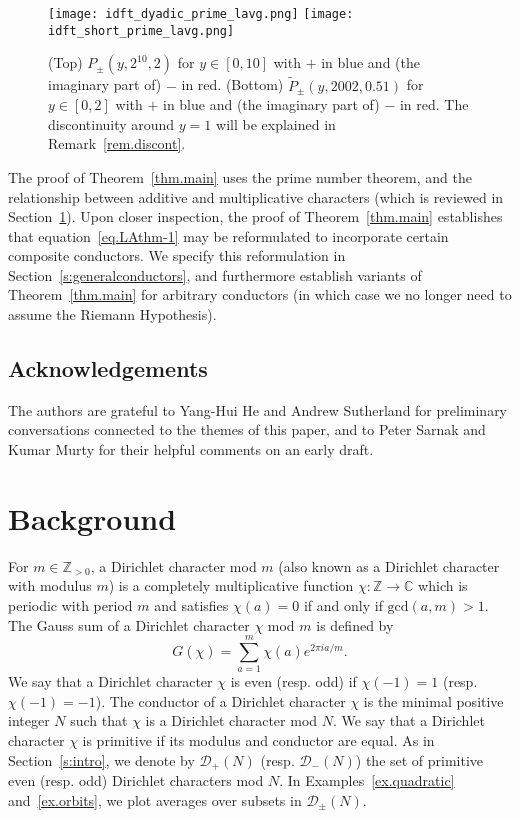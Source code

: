 \documentclass{amsart}
\theoremstyle{definition}
\numberwithin{equation}{section}
\begin{document}
\begin{figure}[h]
\centering
\texttt{[image: idft\_dyadic\_prime\_lavg.png]}
\texttt{[image: idft\_short\_prime\_lavg.png]}
\caption{\sf (Top) $P_\pm(y, 2^{10}, 2)$ for $y \in [0,10]$ with $+$ in blue and (the imaginary part of) $-$ in red. (Bottom) $\widetilde{P}_\pm(y, 2002, 0.51)$ for $y \in [0,2]$ with $+$ in blue and (the imaginary part of) $-$ in red. The discontinuity around $y=1$ will be explained in Remark~\ref{rem.discont}. }
    \label{fig:prime_lavg}
\end{figure}
The proof of Theorem~\ref{thm.main} uses the prime number theorem, and the relationship between additive and multiplicative characters (which is reviewed in Section~\ref{s:background}).
Upon closer inspection, the proof of Theorem~\ref{thm.main} establishes that equation~\eqref{eq.LAthm-1} may be reformulated to incorporate certain composite conductors.
We specify this reformulation in Section~\ref{s:generalconductors}, and furthermore establish variants of Theorem~\ref{thm.main} for arbitrary conductors (in which case we no longer need to assume the Riemann Hypothesis).

\subsection*{Acknowledgements}
The authors are grateful to Yang-Hui He and Andrew Sutherland for preliminary conversations connected to the themes of this paper, and to Peter Sarnak and Kumar Murty for their helpful comments on an early draft.


\section{Background}\label{s:background}
For $m\in\mathbb{Z}_{>0}$, a Dirichlet character mod $m$ (also known as a Dirichlet character with modulus $m$) is a completely multiplicative function $\chi:\mathbb{Z}\rightarrow\mathbb{C}$ which is periodic with period $m$ and satisfies $\chi(a)=0$ if and only if $\mathrm{gcd}(a,m)>1$. 
The Gauss sum of a Dirichlet character $\chi$ mod $m$ is defined by
\[G(\chi)=\sum_{a=1}^m\chi(a)e^{2\pi ia/m}.\]
We say that a Dirichlet character $\chi$ is even (resp. odd) if $\chi(-1)=1$ (resp. $\chi(-1)=-1$).
The conductor of a Dirichlet character $\chi$ is the minimal positive integer $N$ such that $\chi$ is a Dirichlet character mod $N$.
We say that a Dirichlet character $\chi$ is primitive if its modulus and conductor are equal. 
As in Section~\ref{s:intro}, we denote by $\mathcal{D}_{+}(N)$ (resp. $\mathcal{D}_-(N)$) the set of primitive even (resp. odd) Dirichlet characters mod $N$.
In Examples~\ref{ex.quadratic} and~\ref{ex.orbits}, we plot averages over subsets in $\mathcal{D}_{\pm}(N)$.
\end{document}
